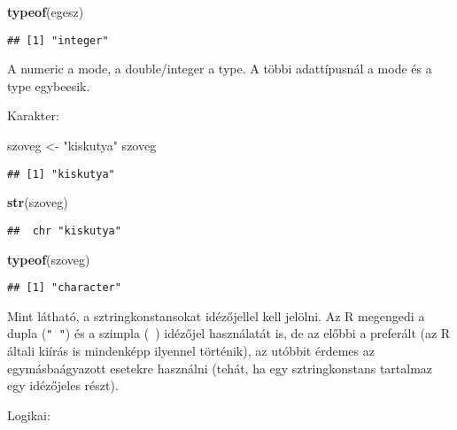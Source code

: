 \documentclass[]{book}
\newenvironment{Shaded}{\begin{snugshade}}{\end{snugshade}}
\newcommand{\KeywordTok}[1]{\textcolor[rgb]{0.13,0.29,0.53}{\textbf{#1}}}
\newcommand{\NormalTok}[1]{#1}
\newcommand{\StringTok}[1]{\textcolor[rgb]{0.31,0.60,0.02}{#1}}
\begin{document}
\begin{Shaded}
\begin{Highlighting}[]
\KeywordTok{typeof}\NormalTok{(egesz)}
\end{Highlighting}
\end{Shaded}

\begin{verbatim}
## [1] "integer"
\end{verbatim}

A numeric a mode, a double/integer a type. A többi adattípusnál a mode és a type egybeesik.

Karakter:

\begin{Shaded}
\begin{Highlighting}[]
\NormalTok{szoveg <-}\StringTok{ "kiskutya"}
\NormalTok{szoveg}
\end{Highlighting}
\end{Shaded}

\begin{verbatim}
## [1] "kiskutya"
\end{verbatim}

\begin{Shaded}
\begin{Highlighting}[]
\KeywordTok{str}\NormalTok{(szoveg)}
\end{Highlighting}
\end{Shaded}

\begin{verbatim}
##  chr "kiskutya"
\end{verbatim}

\begin{Shaded}
\begin{Highlighting}[]
\KeywordTok{typeof}\NormalTok{(szoveg)}
\end{Highlighting}
\end{Shaded}

\begin{verbatim}
## [1] "character"
\end{verbatim}

Mint látható, a sztringkonstansokat idézőjellel kell jelölni. Az R megengedi a dupla (\texttt{"\ "}) és a szimpla (\texttt{\textquotesingle{}\ \textquotesingle{}}) idézőjel használatát is, de az előbbi a preferált (az R általi kiírás is mindenképp ilyennel történik), az utóbbit érdemes az egymásbaágyazott esetekre használni (tehát, ha egy sztringkonstans tartalmaz egy idézőjeles részt).

Logikai:
\end{document}
